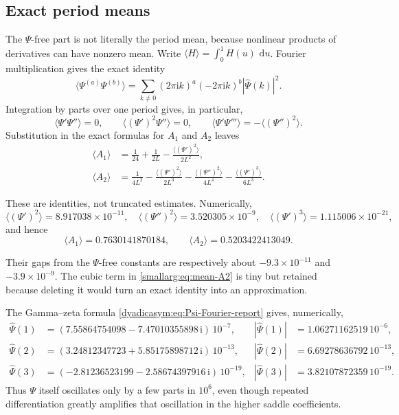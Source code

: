 \documentclass[11pt,oneside]{article}
\theoremstyle{definition}
\theoremstyle{remark}
\newcommand{\ii}{\mathrm i}
\newcommand{\dd}{\,\mathrm d}
\begin{document}
\subsection{Exact period means}

The \(\Psi\)-free part is not literally the period mean, because nonlinear products of
derivatives can have nonzero mean.  Write
\(\langle H\rangle=\int_0^1H(u)\,\dd u\).  Fourier multiplication gives the exact identity
\begin{equation}
 \bigl\langle\Psi^{(a)}\Psi^{(b)}\bigr\rangle
 =\sum_{k\ne0}(2\pi\ii k)^a(-2\pi\ii k)^b
   |\widehat\Psi(k)|^2.
 \label{smallarg:eq:derivative-product-mean}
\end{equation}
Integration by parts over one period gives, in particular,
\[
 \langle\Psi'\Psi''\rangle=0,\qquad
 \langle(\Psi')^2\Psi''\rangle=0,\qquad
 \langle\Psi'\Psi'''\rangle=-\langle(\Psi'')^2\rangle.
\]
Substitution in the exact formulas for \(A_1\) and \(A_2\) leaves
\begin{align}
 \langle A_1\rangle
 &=\frac1{24}+\frac1{2L}
   -\frac{\langle(\Psi')^2\rangle}{2L^2},
   \label{smallarg:eq:mean-A1}\\
 \langle A_2\rangle
 &=\frac1{4L^2}
   -\frac{\langle(\Psi')^2\rangle}{2L^3}
   -\frac{\langle(\Psi'')^2\rangle}{4L^4}
   -\frac{\langle(\Psi')^3\rangle}{6L^3}.
   \label{smallarg:eq:mean-A2}
\end{align}
\begin{samepage}
These are identities, not truncated estimates.  Numerically,
\[
 \langle(\Psi')^2\rangle=8.917038\times10^{-11},\quad
 \langle(\Psi'')^2\rangle=3.520305\times10^{-9},\quad
 \langle(\Psi')^3\rangle=1.115006\times10^{-21},
\]
and hence
\[
 \langle A_1\rangle=0.7630141870184,\qquad
 \langle A_2\rangle=0.5203422413049.
\]
\end{samepage}
Their gaps from the \(\Psi\)-free constants are respectively about
\(-9.3\times10^{-11}\) and \(-3.9\times10^{-9}\).  The cubic term in
\eqref{smallarg:eq:mean-A2} is tiny but retained because deleting it would turn an exact
identity into an approximation.

The Gamma--zeta formula \eqref{dyadicasym:eq:Psi-Fourier-report} gives, numerically,
\[
\begin{aligned}
  \widehat\Psi(1)&=(7.55864754098-7.47010355898\,\ii)\,10^{-7},
    &|\widehat\Psi(1)|&=1.06271162519\,10^{-6},\\
  \widehat\Psi(2)&=(3.24812347723+5.85175898712\,\ii)\,10^{-13},
    &|\widehat\Psi(2)|&=6.69278636792\,10^{-13},\\
  \widehat\Psi(3)&=(-2.81236523199-2.58674397916\,\ii)\,10^{-19},
    &|\widehat\Psi(3)|&=3.82107872359\,10^{-19}.
\end{aligned}
\]
Thus \(\Psi\) itself oscillates only by a few parts in \(10^6\), even though repeated
differentiation greatly amplifies that oscillation in the higher saddle coefficients.
\end{document}

